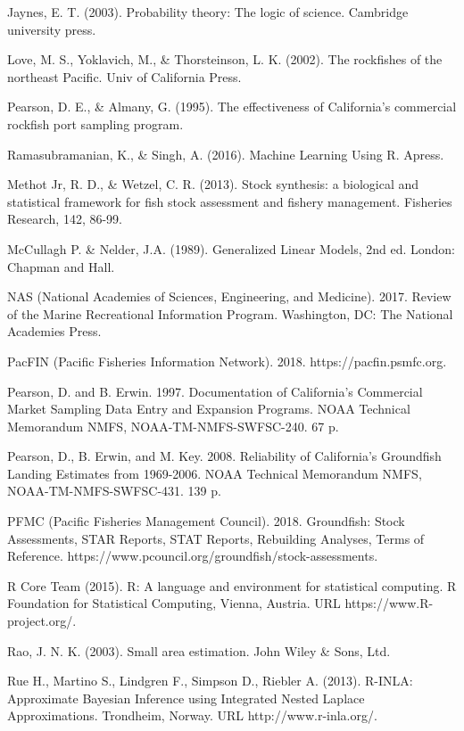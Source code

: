 \documentclass[12pt]{article}
\begin{document}
\begin{thebibliography}{1}
%
 Jaynes, E. T. (2003). Probability theory: The logic of 
science. Cambridge university press.

%
 Love, M. S., Yoklavich, M., \& Thorsteinson, L. K. (2002). The 
rockfishes of the northeast Pacific. Univ of California Press.

%
 Pearson, D. E., \& Almany, G. (1995). The effectiveness of 
California's commercial rockfish port sampling program.

%
 Ramasubramanian, K., \& Singh, A. (2016). Machine Learning 
Using R. Apress.

%
 Methot Jr, R. D., \& Wetzel, C. R. (2013). Stock synthesis: a 
biological and statistical framework for fish stock assessment and fishery 
management.  Fisheries Research, 142, 86-99.

%
 McCullagh P. \& Nelder, J.A. (1989). Generalized Linear 
Models, 2nd ed. London: Chapman and Hall.

%
 NAS (National Academies of Sciences, Engineering, and Medicine). 
2017. Review of the Marine Recreational Information Program. Washington, DC: 
The National Academies Press.

%
 PacFIN (Pacific Fisheries Information Network). 2018. 
https://pacfin.psmfc.org.

%
 Pearson, D. and B. Erwin. 1997. Documentation of 
California's Commercial Market Sampling Data Entry and Expansion Programs. 
NOAA Technical Memorandum NMFS, NOAA-TM-NMFS-SWFSC-240. 67 p.

%
Pearson, D., B. Erwin, and M. Key. 2008. Reliability 
of California's Groundfish Landing Estimates from 1969-2006. NOAA Technical 
Memorandum NMFS, NOAA-TM-NMFS-SWFSC-431. 139 p.

%
 PFMC (Pacific Fisheries Management Council). 2018. 
Groundfish: Stock Assessments, STAR Reports, STAT Reports, Rebuilding 
Analyses, Terms of Reference. https://www.pcouncil.org/groundfish/stock-assessments.

%
 R Core Team (2015). R: A language and environment for 
statistical computing. R Foundation for Statistical Computing, Vienna, 
Austria. URL https://www.R-project.org/.

%
 Rao, J. N. K. (2003). Small area estimation. John Wiley \& Sons, Ltd.

%
 Rue H., Martino S., Lindgren F., Simpson D., Riebler A. 
(2013). R-INLA: Approximate Bayesian Inference using Integrated Nested Laplace 
Approximations.  Trondheim, Norway. URL 
http://www.r-inla.org/.


\end{thebibliography}
\end{document}
